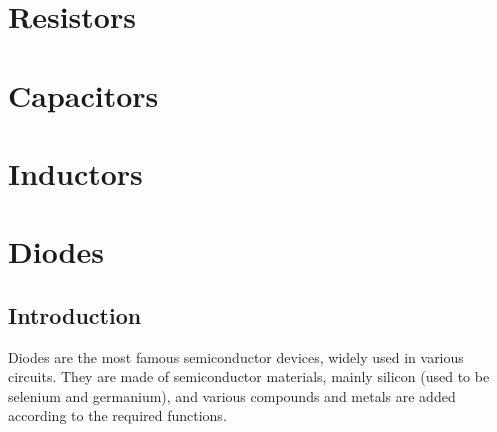 \documentclass[UTF8]{report}
\begin{document}
    \setcounter{tocdepth}{2}    %
        \tableofcontents
        \thispagestyle{fancy}                   %

    \newpage    






\chapter{Resistors}\thispagestyle{fancy}


\chapter{Capacitors}\thispagestyle{fancy}

\chapter{Inductors}\thispagestyle{fancy}

\chapter{Diodes}\thispagestyle{fancy}

\section{Introduction}
Diodes are the most famous semiconductor devices, widely used in various circuits. They are made of semiconductor materials, mainly silicon (used to be selenium and germanium), and various compounds and metals are added according to the required functions.
\end{document}
